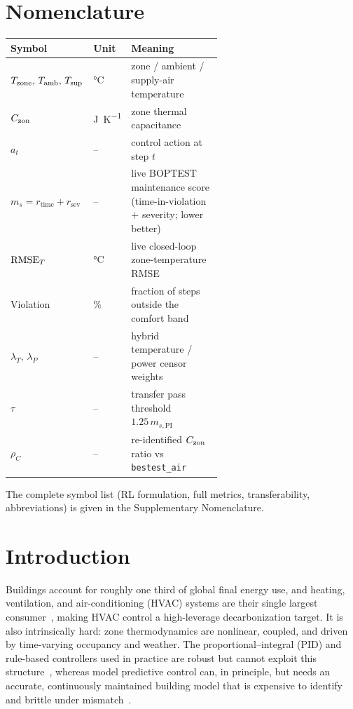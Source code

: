 \section*{Nomenclature}
\renewcommand{\arraystretch}{1.1}
\begin{tabular}{@{}l l p{0.60\linewidth}@{}}
\textbf{Symbol} & \textbf{Unit} & \textbf{Meaning} \\
\midrule
$T_{\mathrm{zone}},\,T_{\mathrm{amb}},\,T_{\mathrm{sup}}$ & \si{\celsius} & zone / ambient / supply-air temperature \\
$C_{\mathrm{zon}}$ & \si{\joule\per\kelvin} & zone thermal capacitance \\
$a_t$ & -- & control action at step $t$ \\
$m_s=r_{\mathrm{time}}{+}r_{\mathrm{sev}}$ & -- & live BOPTEST maintenance score (time-in-violation $+$ severity; lower better) \\
$\mathrm{RMSE}_T$ & \si{\celsius} & live closed-loop zone-temperature RMSE \\
Violation & \si{\percent} & fraction of steps outside the comfort band \\
$\lambda_T,\,\lambda_P$ & -- & hybrid temperature / power censor weights \\
$\tau$ & -- & transfer pass threshold $1.25\,m_{s,\mathrm{PI}}$ \\
$\rho_C$ & -- & re-identified $C_{\mathrm{zon}}$ ratio vs \texttt{bestest\_air} \\
\bottomrule
\end{tabular}

{\footnotesize\noindent The complete symbol list (RL formulation, full metrics, transferability, abbreviations) is given in the Supplementary Nomenclature.\par}

\setcounter{table}{0}

\section{Introduction}

Buildings account for roughly one third of global final energy use, and heating, ventilation, and air-conditioning (HVAC) systems are their single largest consumer~\citep{AlSayed2024Review,Nguyen2024Modelling}, making HVAC control a high-leverage decarbonization target. It is also intrinsically hard: zone thermodynamics are nonlinear, coupled, and driven by time-varying occupancy and weather. The proportional--integral (PID) and rule-based controllers used in practice are robust but cannot exploit this structure~\citep{Savino2025ASHRAE,Gao2024Predictive}, whereas model predictive control can, in principle, but needs an accurate, continuously maintained building model that is expensive to identify and brittle under mismatch~\citep{Hou2024MultiSource}.

